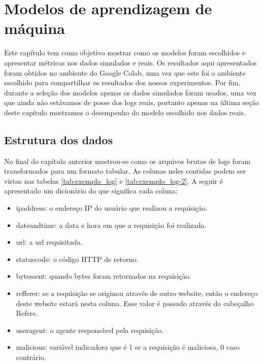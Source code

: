 
\chapter{Modelos de aprendizagem de máquina}
\label{cap:models}

Este capítulo tem como objetivo mostrar como os modelos foram escolhidos e apresentar
métricas nos dados simulados e reais. Os resultados aqui apresentados foram obtidos no 
ambiente do Google Colab, uma vez que este foi o ambiente escolhido para compartilhar 
os resultados dos nossos experimentos. Por fim, durante a seleção dos modelos apenas os dados 
simulados foram usados, uma vez que ainda não estávamos de posse dos logs reais, portanto 
apenas na última seção deste capítulo mostramos o desempenho do modelo escolhido nos dados reais.


\section{Estrutura dos dados}

No final do capítulo anterior mostrou-se como os arquivos brutos de logs foram transformados
para um formato tabular. As colunas neles contidas podem ser vistas nas tabelas \ref{tab:exemplo_log} e \ref{tab:exemplo_log-2}. 
A seguir é apresentado um dicionário do que significa cada coluna:


\begin{itemize}
    \item ipaddress: o endereço IP do usuário que realizou a requisição.
    \item dateandtime: a data e hora em que a requisição foi realizada.
    \item url: a url requisitada.
    \item statuscode: o código HTTP de retorno.
    \item bytessent: quando bytes foram retornados na requisição.
    \item refferer: se a requisição se originou através de outro website, então o endereço deste 
    website estará nesta coluna. Esse valor é passado através do cabeçalho Refere.
    \item useragent: o agente responsável pela requisição.
    \item malicious: variável indicadora que é 1 se a requisição é maliciosa, 0 caso contrário.
\end{itemize}



